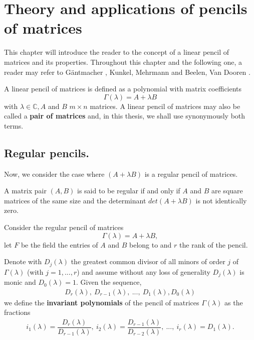 \section{Theory and applications of pencils of matrices}
This chapter will introduce the reader to the concept of a linear pencil of matrices and its properties. Throughout this
chapter and the following one, a reader may refer to G\"antmacher \cite{gantmacher}, Kunkel, Mehrmann
\cite{kunkel-mehrmann} and Beelen, Van Dooren \cite{beelen-van_dooren}.
\begin{definition}
    A linear pencil of matrices is defined as a polynomial with matrix coefficients
    \[
        \Gamma(\lambda) = A + \lambda B
    \]
    with \(\lambda \in \mathbb{C}, A\) and \(B\) \(m \times n\) matrices.
    A linear pencil of matrices may also be called a \textbf{pair of matrices} and, in this thesis, we shall use
    synonymously both terms.
\end{definition}

\subsection*{Regular pencils.}
Now, we consider the case where \((A + \lambda B)\) is a regular pencil of matrices.
\begin{definition}
    A matrix pair \((A, B)\) is said to be regular if and only if \(A\) and \(B\) are square matrices of the same size and
    the determinant \(det(A + \lambda B)\) is not identically zero.
\end{definition}

Consider the regular pencil of matrices
\[\Gamma(\lambda) = A + \lambda B,\]
let \(F\) be the field the entries of \(A\) and \(B\) belong to and \(r\) the rank of the pencil.

Denote with \(D_{j}(\lambda)\) the greatest common divisor of all minors of order \(j\) of \(\Gamma(\lambda)\)
(with \(j = 1, ..., r\)) and assume without any loss of generality \(D_{j}(\lambda)\) is monic and
\(D_{0}(\lambda) = 1\). Given the sequence,
\begin{gather*}
    D_{r}(\lambda), \
    D_{r-1}(\lambda), \
    ..., \
    D_{1}(\lambda), D_{0}(\lambda)
\end{gather*}
we define the \textbf{invariant polynomials} of the pencil of matrices \(\Gamma(\lambda)\) as the fractions
\begin{gather*}
    i_{1}(\lambda) = \dfrac{D_{r}(\lambda)}{D_{r-1}(\lambda)}, \
    i_{2}(\lambda) = \dfrac{D_{r-1}(\lambda)}{D_{r-2}(\lambda)}, \
    ..., \
    i_{r}(\lambda) = D_{1}(\lambda).
\end{gather*}

